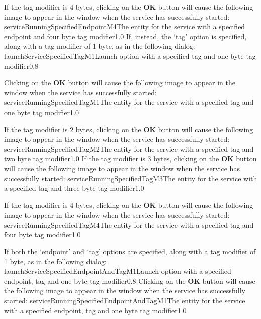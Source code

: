 If the tag modifier is 4 bytes, clicking on the \textbf{OK} button will cause the
following image to appear in the \emph{\MMMU} window when the service has successfully
started:
%
{serviceRunningSpecifiedEndpointM4}{The \emph{\MMMU} entity for the service with a
specified endpoint and four byte tag modifier}{1.0}
\condPage{}
If, instead, the `tag' option is specified, along with a tag modifier of 1 byte, as in the
following dialog:
%
{launchServiceSpecifiedTagM1}{Launch option with a specified tag and one byte tag
modifier}{0.8}

Clicking on the \textbf{OK} button will cause the following image to appear in the
\emph{\MMMU} window when the service has successfully started:
%
{serviceRunningSpecifiedTagM1}{The \emph{\MMMU} entity for the service with a specified
tag and one byte tag modifier}{1.0}

If the tag modifier is 2 bytes, clicking on the \textbf{OK} button will cause the
following image to appear in the \emph{\MMMU} window when the service has successfully
started:
%
{serviceRunningSpecifiedTagM2}{The \emph{\MMMU} entity for the service with a specified
tag and two byte tag modifier}{1.0}
\condPage{}
If the tag modifier is 3 bytes, clicking on the \textbf{OK} button will cause the
following image to appear in the \emph{\MMMU} window when the service has successfully
started:
%
{serviceRunningSpecifiedTagM3}{The \emph{\MMMU} entity for the service with a specified
tag and three byte tag modifier}{1.0}

If the tag modifier is 4 bytes, clicking on the \textbf{OK} button will cause the
following image to appear in the \emph{\MMMU} window when the service has successfully
started:
%
{serviceRunningSpecifiedTagM4}{The \emph{\MMMU} entity for the service with a specified
tag and four byte tag modifier}{1.0}

If both the `endpoint' and `tag' options are specified, along with a tag modifier of 1
byte, as in the following dialog:
%
{launchServiceSpecifiedEndpointAndTagM1}{Launch option with a specified endpoint, tag and
one byte tag modifier}{0.8}
\condPage{}
Clicking on the \textbf{OK} button will cause the following image to appear in the
\emph{\MMMU} window when the service has successfully started:
%
{serviceRunningSpecifiedEndpointAndTagM1}{The \emph{\MMMU} entity for the service with a
specified endpoint, tag and one byte tag modifier}{1.0}

